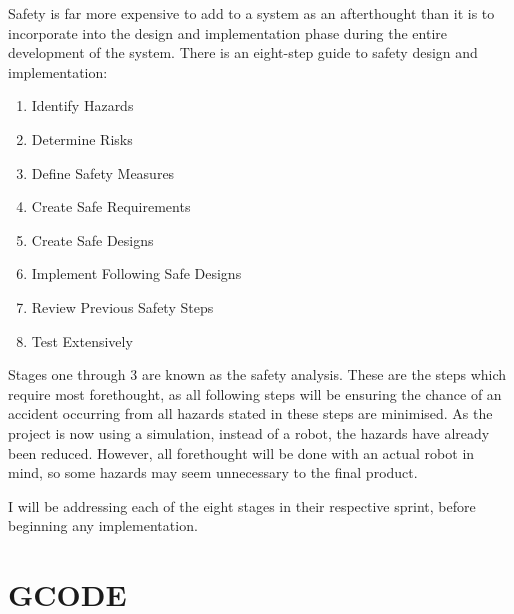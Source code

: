 			Safety is far more expensive to add to a system as an afterthought than it is to incorporate into the design and implementation phase during the entire development of the system. There is an eight-step guide to safety design and implementation:
			\begin{enumerate}
				\item Identify Hazards
				\item Determine Risks
				\item Define Safety Measures
				\item Create Safe Requirements
				\item Create Safe Designs
				\item Implement Following Safe Designs
				\item Review Previous Safety Steps
				\item Test Extensively
			\end{enumerate}
			Stages one through 3 are known as the safety analysis. These are the steps which require most forethought, as all following steps will be ensuring the chance of an accident occurring from all hazards stated in these steps are minimised. As the project is now using a simulation, instead of a robot, the hazards have already been reduced. However, all forethought will be done with an actual robot in mind, so some hazards may seem unnecessary to the final product.

			I will be addressing each of the eight stages in their respective sprint, before beginning any implementation.
			

	\section{GCODE}
		\label{sec:gcode}

